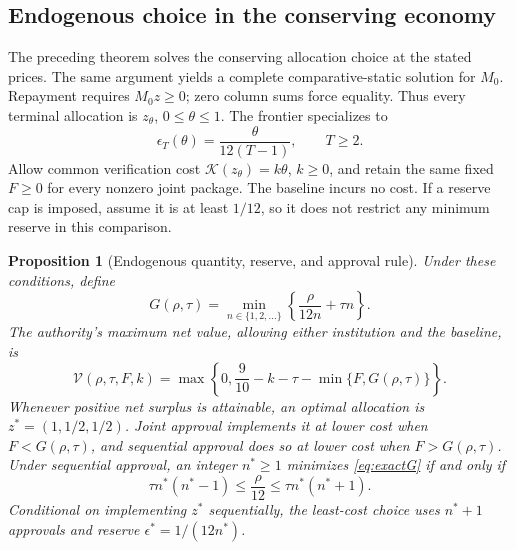 \documentclass[ecta,draft,supplement]{econsocart}
\newtheorem{proposition}[theorem]{Proposition}
\theoremstyle{definition}
\theoremstyle{definition}
\begin{document}
\begin{appendix}
\subsection{Endogenous choice in the conserving economy}

The preceding theorem solves the conserving allocation choice at the stated
prices. The same argument yields a complete comparative-static solution for
$M_0$. Repayment requires $M_0z\geq0$; zero column sums force equality.
Thus every terminal allocation is $z_\theta$, $0\leq\theta\leq1$.
The frontier specializes to
\begin{equation}
 \epsilon_T(\theta)=\frac{\theta}{12(T-1)},\qquad T\geq2.
 \label{eq:exactseedthreshold}
\end{equation}
Allow common verification cost $\mathcal K(z_\theta)=k\theta$, $k\geq0$, and
retain the same fixed $F\geq0$ for every nonzero joint package. The baseline
incurs no cost. If a reserve cap is imposed, assume it is at least $1/12$,
so it does not restrict any minimum reserve in this comparison.

\begin{proposition}[Endogenous quantity, reserve, and approval rule]
\label{prop:exactdesign}
Under these conditions, define
\begin{equation}
 G(\rho,\tau)=\min_{n\in\{1,2,\ldots\}}
       \left\{\frac{\rho}{12n}+\tau n\right\}.
 \label{eq:exactG}
\end{equation}
The authority's maximum net value, allowing either institution and the
baseline, is
\begin{equation}
 \mathcal V(\rho,\tau,F,k)=
 \max\left\{0,\frac9{10}-k-\tau-
                         \min\{F,G(\rho,\tau)\}\right\}.
 \label{eq:exactdesignvalue}
\end{equation}
Whenever positive net surplus is attainable, an optimal allocation is
$z^*=(1,1/2,1/2)$. Joint approval implements it at lower cost when
$F<G(\rho,\tau)$, and sequential approval does so at lower cost when
$F>G(\rho,\tau)$. Under sequential approval, an integer $n^*\geq1$
minimizes \eqref{eq:exactG} if and only if
\begin{equation}
 \tau n^*(n^*-1)\leq\frac\rho{12}
       \leq\tau n^*(n^*+1).
 \label{eq:integerreservechoice}
\end{equation}
Conditional on implementing $z^*$ sequentially, the least-cost choice uses $n^*+1$ approvals and reserve
$\epsilon^*=1/(12n^*)$.
\end{proposition}



\end{appendix}
\end{document}
